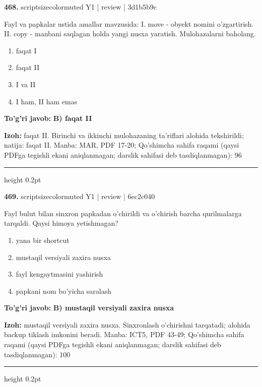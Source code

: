\documentclass[10pt,a4paper]{article}
\begin{document}
{\bfseries\sffamily\color{ink} 468.} {scriptsizecolor{muted} Y1 | review | 3d1b5b9c}
\par
Fayl va papkalar ustida amallar mavzusida: I. move - obyekt nomini o'zgartirish. II. copy - manbani saqlagan holda yangi nusxa yaratish. Mulohazalarni baholang.
\begin{enumerate}[label=\Alph*),leftmargin=9mm]
\item faqat I
\item faqat II
\item I va II
\item I ham, II ham emas
\end{enumerate}
\begin{tcolorbox}[enhanced,breakable,colback=teal!4,colframe=teal!60!black,boxrule=0.45pt,arc=1.2mm,left=2.7mm,right=2.7mm,top=1.8mm,bottom=1.8mm,before skip=2mm,after skip=2mm]
{\bfseries\sffamily\color{teal}To'g'ri javob:} \textbf{B) faqat II}
\par\smallskip
{\bfseries Izoh:} faqat II. Birinchi va ikkinchi mulohazaning ta'riflari alohida tekshirildi; natija: faqat II. Manba: MAR, PDF 17-20; Qo'shimcha sahifa raqami (qaysi PDFga tegishli ekani aniqlanmagan; darslik sahifasi deb tasdiqlanmagan): 96
\end{tcolorbox}
\vspace{2mm}\hrule height 0.2pt\vspace{3mm}

{\bfseries\sffamily\color{ink} 469.} {scriptsizecolor{muted} Y1 | review | 6ec2c040}
\par
Fayl bulut bilan sinxron papkadan o'chirildi va o'chirish barcha qurilmalarga tarqaldi. Qaysi himoya yetishmagan?
\begin{enumerate}[label=\Alph*),leftmargin=9mm]
\item yana bir shortcut
\item mustaqil versiyali zaxira nusxa
\item fayl kengaytmasini yashirish
\item papkani nom bo'yicha saralash
\end{enumerate}
\begin{tcolorbox}[enhanced,breakable,colback=teal!4,colframe=teal!60!black,boxrule=0.45pt,arc=1.2mm,left=2.7mm,right=2.7mm,top=1.8mm,bottom=1.8mm,before skip=2mm,after skip=2mm]
{\bfseries\sffamily\color{teal}To'g'ri javob:} \textbf{B) mustaqil versiyali zaxira nusxa}
\par\smallskip
{\bfseries Izoh:} mustaqil versiyali zaxira nusxa. Sinxronlash o'chirishni tarqatadi; alohida backup tiklash imkonini beradi. Manba: ICT5, PDF 43-49; Qo'shimcha sahifa raqami (qaysi PDFga tegishli ekani aniqlanmagan; darslik sahifasi deb tasdiqlanmagan): 100
\end{tcolorbox}
\vspace{2mm}\hrule height 0.2pt\vspace{3mm}
\end{document}
